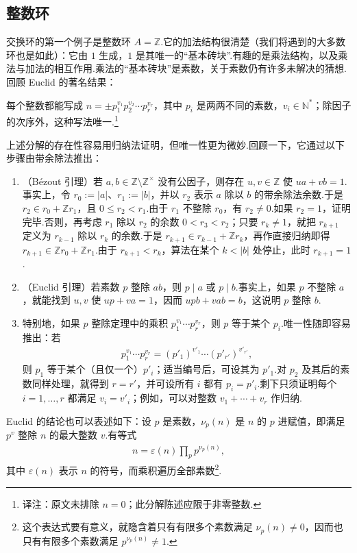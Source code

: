 \subsection{整数环}\label{sec:galois-1-1-1}
交换环的第一个例子是整数环 $A=\mathbb Z$.它的加法结构很清楚（我们将遇到的大多数环也是如此）：它由 $1$ 生成，$1$ 是其唯一的``基本砖块''.有趣的是乘法结构，以及乘法与加法的相互作用.乘法的``基本砖块''是素数，关于素数仍有许多未解决的猜想.回顾 Euclid 的著名结果：
\begin{theorem*}[{唯一分解}]
每个整数都能写成 $n=\pm p_1^{v_1}p_2^{v_2}\cdots p_r^{v_r}$，其中 $p_i$ 是两两不同的素数，$v_i\in\mathbb N^*$；除因子的次序外，这种写法唯一.\footnote{译注：原文未排除 $n=0$；此分解陈述应限于非零整数.}
\end{theorem*}
上述分解的存在性容易用归纳法证明，但唯一性更为微妙.回顾一下，它通过以下步骤由带余除法推出：
\begin{enumerate}
\item （Bézout 引理）若 $a,b\in\mathbb Z\setminus\mathbb Z^\times$ 没有公因子，则存在 $u,v\in\mathbb Z$ 使 $ua+vb=1$.事实上，令 $r_0:=|a|$、$r_1:=|b|$，并以 $r_2$ 表示 $a$ 除以 $b$ 的带余除法余数.于是 $r_2\in r_0+\mathbb Zr_1$，且 $0\leq r_2<r_1$.由于 $r_1$ 不整除 $r_0$，有 $r_2\ne0$.如果 $r_2=1$，证明完毕.否则，再考虑 $r_1$ 除以 $r_2$ 的余数 $0<r_3<r_2$；只要 $r_k\ne1$，就把 $r_{k+1}$ 定义为 $r_{k-1}$ 除以 $r_k$ 的余数.于是 $r_{k+1}\in r_{k-1}+\mathbb Zr_k$，再作直接归纳即得 $r_{k+1}\in\mathbb Zr_0+\mathbb Zr_1$.由于 $r_{k+1}<r_k$，算法在某个 $k<|b|$ 处停止，此时 $r_{k+1}=1$.
\item （Euclid 引理）若素数 $p$ 整除 $ab$，则 $p\mid a$ 或 $p\mid b$.事实上，如果 $p$ 不整除 $a$，就能找到 $u,v$ 使 $up+va=1$，因而 $upb+vab=b$，这说明 $p$ 整除 $b$.
\item 特别地，如果 $p$ 整除定理中的乘积 $p_1^{v_1}\cdots p_r^{v_r}$，则 $p$ 等于某个 $p_i$.唯一性随即容易推出：若
\begin{align*}
p_1^{v_1}\cdots p_r^{v_r}=(p'_1)^{v'_1}\cdots(p'_{r'})^{v'_{r'}},
\end{align*}
则 $p_1$ 等于某个（且仅一个）$p'_i$；适当编号后，可设其为 $p'_1$.对 $p_2$ 及其后的素数同样处理，就得到 $r=r'$，并可设所有 $i$ 都有 $p_i=p'_i$.剩下只须证明每个 $i=1,\ldots,r$ 都满足 $v_i=v'_i$；例如，可以对整数 $v_1+\cdots+v_r$ 作归纳.
\end{enumerate}
Euclid 的结论也可以表述如下：设 $p$ 是素数，$\nu_p(n)$ 是 $n$ 的 $p$ 进赋值，即满足 $p^v$ 整除 $n$ 的最大整数 $v$.有等式
\begin{align*}
n=\varepsilon(n)\prod_p p^{\nu_p(n)},
\end{align*}
其中 $\varepsilon(n)$ 表示 $n$ 的符号，而乘积遍历全部素数\footnote{这个表达式要有意义，就隐含着只有有限多个素数满足 $\nu_p(n)\ne0$，因而也只有有限多个素数满足 $p^{\nu_p(n)}\ne1$.}.

